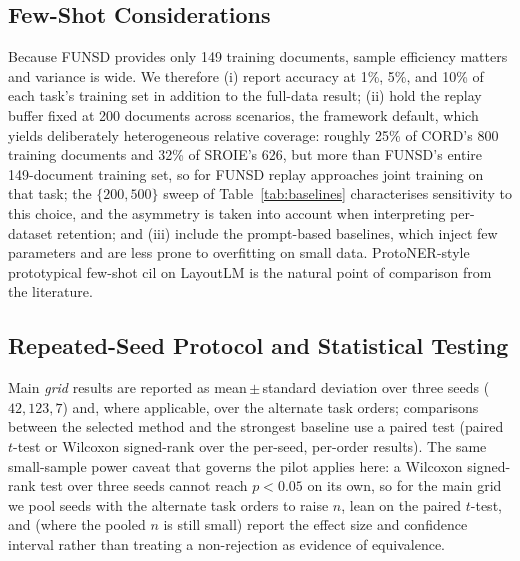 \subsection{Few-Shot Considerations}
\label{sec:eval-fewshot}

Because FUNSD provides only 149 training documents, sample efficiency matters and
variance is wide. We therefore (i) report accuracy at 1\%, 5\%, and 10\% of each
task's training set in addition to the full-data result; (ii) hold the replay
buffer fixed at 200 documents across scenarios, the framework default, which
yields deliberately heterogeneous relative coverage: roughly 25\% of CORD's 800
training documents and 32\% of SROIE's 626, but more than FUNSD's entire
149-document training set, so for FUNSD replay approaches joint training on
that task; the $\{200, 500\}$ sweep of Table~\ref{tab:baselines} characterises
sensitivity to this choice, and the asymmetry is taken into account when
interpreting per-dataset retention; and (iii)
include the prompt-based baselines, which inject few parameters and are less prone
to overfitting on small data. ProtoNER-style prototypical few-shot \gls{cil} on
LayoutLM is the natural point of comparison from the literature.

\subsection{Repeated-Seed Protocol and Statistical Testing}
\label{sec:eval-seeds}

Main \emph{grid} results are reported as mean\,$\pm$\,standard deviation over three
seeds ($42, 123, 7$) and, where applicable, over the alternate task orders;
comparisons between the selected method and the strongest baseline use a paired
test (paired $t$-test or Wilcoxon signed-rank over the per-seed, per-order results).
The same small-sample power caveat that governs the pilot applies here: a Wilcoxon
signed-rank test over three seeds cannot reach $p<0.05$ on its own, so for the main
grid we pool seeds with the alternate task orders to raise $n$, lean on the paired
$t$-test, and (where the pooled $n$ is still small) report the effect size and
confidence interval rather than treating a non-rejection as evidence of equivalence.

